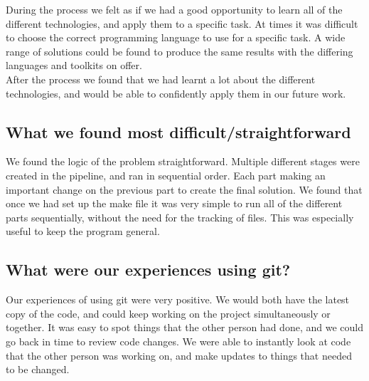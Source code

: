 \documentclass{article}
\begin{document}
During the process we felt as if we had a good opportunity to learn all of the different technologies, and apply them to a specific task. At times it was difficult to choose the correct programming language to use for a specific task. A wide range of solutions could be found to produce the same results with the differing languages and toolkits on offer. \\

After the process we found that we had learnt a lot about the different technologies, and would be able to confidently apply them in our future work.

\subsection*{What we found most difficult/straightforward}

We found the logic of the problem straightforward. Multiple different stages were created in the pipeline, and ran in sequential order. Each part making an important change on the previous part to create the final solution. We found that once we had set up the make file it was very simple to run all of the different parts sequentially, without the need for the tracking of files. This was especially useful to keep the program general.

\subsection*{What were our experiences using git?}

Our experiences of using git were very positive. We would both have the latest copy of the code, and could keep working on the project simultaneously or together.  It was easy to spot things that the other person had done, and we could go back in time to review code changes. We were able to instantly look at code that the other person was working on, and make updates to things that needed to be changed.
\end{document}
